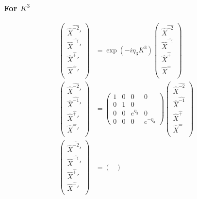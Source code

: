 \documentclass[]{article}
\numberwithin{equation}{section}
\begin{document}
{{\subsubsection{For $K^3$}
\begin{align}
\begin{pmatrix}
    \hat{X}^{\hat{-2}}'\\
    \hat{X}^{\hat{-1}}'\\
    \hat{X}^{\hat{+}}'\\
    \hat{X}^{\hat{-}}'\\
    \end{pmatrix}&= \exp{(-i\eta_{3} K^{3})}\begin{pmatrix}
    \hat{X}^{\hat{-2}}\\
    \hat{X}^{\hat{-1}}\\
    \hat{X}^{\hat{+}}\\
    \hat{X}^{\hat{-}}\\
    \end{pmatrix}\\
    \begin{pmatrix}
    \hat{X}^{\hat{-2}}'\\
    \hat{X}^{\hat{-1}}'\\
    \hat{X}^{\hat{+}}'\\
    \hat{X}^{\hat{-}}'\\
    \end{pmatrix}&= \begin{pmatrix}
        1&0&0&0\\
        0&1&0&\\
        0&0&e^{\eta_{3}}&0\\
        0&0&0&e^{-\eta_{3}}
    \end{pmatrix}\begin{pmatrix}
    \hat{X}^{\hat{-2}}\\
    \hat{X}^{\hat{-1}}\\
    \hat{X}^{\hat{+}}\\
    \hat{X}^{\hat{-}}\\
    \end{pmatrix}\\
    \begin{pmatrix}
    \hat{X}^{\hat{-2}}'\\
    \hat{X}^{\hat{-1}}'\\
    \hat{X}^{\hat{+}}'\\
    \hat{X}^{\hat{-}}'\\
    \end{pmatrix}&= \begin{pmatrix}

\end{pmatrix}
\end{align}}}
\end{document}
